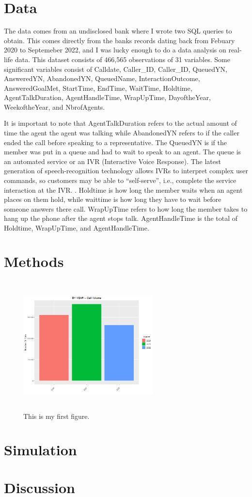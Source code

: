 \documentclass[12pt]{article}
\begin{document}
\section*{Data}
\begin{sloppypar}
  The data comes from an undisclosed bank where I wrote two SQL queries to obtain. This comes directly from the banks records dating back from Febuary 2020
  to Septemeber 2022, and I was lucky enough to do a data analysis on real-life data. This dataset consists of 466,565 observations of 31 variables. 
  Some significant variables consist of Calldate, Caller_ID, Caller_ID, QueuedYN, AnsweredYN, AbandonedYN, QueuedName, InteractionOutcome, 
  AnsweredGoalMet, StartTime, EndTime, WaitTime, Holdtime, AgentTalkDuration, AgentHandleTime, WrapUpTime, DayoftheYear,
  WeekoftheYear, and NbrofAgents.
\end{sloppypar}
  It is important to note that AgentTalkDuration refers to the actual amount of time the agent the agent was talking while
AbandonedYN refers to if the caller ended the call before speaking to a representative. The QueuedYN is if the member was put in a queue and had to wait to speak to an agent.
The queue is an automated service or an IVR (Interactive Voice Response). The latest generation of speech-recognition technology allows
IVRs to interpret complex user commands, so customers may be able to “self-serve”, i.e., complete the service interaction at the IVR. \citep{avramidis2005modeling}.
Holdtime is how long the member waits when an agent places on them hold, while waittime is how long they have to wait before someone answers there call.
WrapUpTime refers to how long the member takes to hang up the phone after the agent stops talk. AgentHandleTime is the total of Holdtime, WrapUpTime, and AgentHandleTime.


\section*{Methods}
\begin{figure}[H]
    \centering
    \includegraphics[width=200pt,height=200pt]{By Year.png}
    \caption{This is my first figure.}
    \label{fig:Year}
  \end{figure}

\section*{Simulation}



\section*{Discussion}




\end{document}
